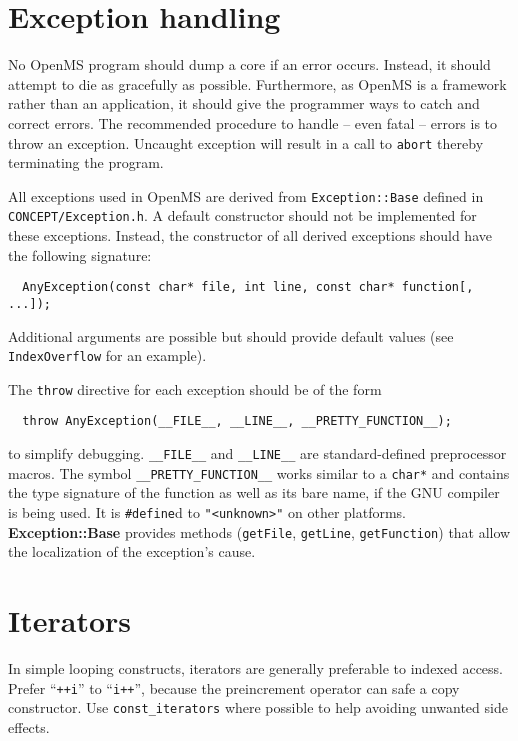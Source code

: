 \documentclass[a4]{article}
\begin{document}
\section{Exception handling}

No OpenMS program should dump a core if an error occurs. Instead, it should
attempt to die as gracefully as possible. Furthermore, as OpenMS is a
framework rather than an application, it should give the programmer ways to
catch and correct errors.
The recommended procedure to handle -- even fatal -- errors is to throw an exception. Uncaught
exception will result in a call to {\tt abort} thereby terminating the
program.

All exceptions used in OpenMS are derived from \texttt{Exception::Base}
defined in \texttt{CONCEPT/Exception.h}. A default constructor should not be
implemented for these exceptions. Instead, the constructor of all derived
exceptions should have the following signature:
\begin{verbatim}
  AnyException(const char* file, int line, const char* function[, ...]);
\end{verbatim}
Additional arguments are possible but should provide default values (see
{\tt IndexOverflow} for an example).

The {\tt throw} directive for each exception should be of the form
\begin{verbatim}
  throw AnyException(__FILE__, __LINE__, __PRETTY_FUNCTION__);
\end{verbatim}
to simplify debugging.  {\tt \_\_FILE\_\_} and {\tt \_\_LINE\_\_} are standard-defined
preprocessor macros.  The symbol {\tt \_\_PRETTY\_FUNCTION\_\_} works similar to a
\verb|char*| and contains the type signature of the function as well as its
bare name, if the GNU compiler is being used.  It is \verb|#define|d to
\verb|"<unknown>"| on other platforms. {\bf Exception::Base} provides methods
({\tt getFile}, {\tt getLine}, {\tt getFunction}) that allow the localization
of the exception's cause.

\section{Iterators}

In simple looping constructs, iterators are generally preferable to indexed
access.  Prefer ``\verb|++i|'' to ``\verb|i++|'', because the preincrement operator can safe
a copy constructor.  Use \verb|const_iterators| where possible to help
avoiding unwanted side effects.
\end{document}
